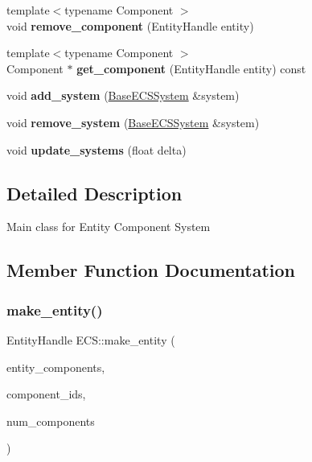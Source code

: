 \begin{DoxyCompactItemize}
{\footnotesize template$<$typename Component $>$ }\\void {\bfseries remove\+\_\+component} (Entity\+Handle entity)
\item 
\mbox{\label{classECS_a05bf55eb5a0a8d49881fac023b50581e}} 
{\footnotesize template$<$typename Component $>$ }\\Component $\ast$ {\bfseries get\+\_\+component} (Entity\+Handle entity) const
\item 
\mbox{\label{classECS_af3e5006e5d71622d79c0add84a103e4e}} 
void {\bfseries add\+\_\+system} (\hyperlink{classBaseECSSystem}{Base\+E\+C\+S\+System} \&system)
\item 
\mbox{\label{classECS_a5ca1fe0202fe1a59f76ac061bb247fe8}} 
void {\bfseries remove\+\_\+system} (\hyperlink{classBaseECSSystem}{Base\+E\+C\+S\+System} \&system)
\item 
\mbox{\label{classECS_ab565442f53e9175caeac308b2947ccc8}} 
void {\bfseries update\+\_\+systems} (float delta)
\end{DoxyCompactItemize}


\subsection{Detailed Description}
Main class for Entity Component System 

\subsection{Member Function Documentation}
\mbox{\label{classECS_aeb3ab746cd0f198cd86631489e438ea6}} 
\subsubsection{\texorpdfstring{make\+\_\+entity()}{make\_entity()}}
{\footnotesize\ttfamily Entity\+Handle E\+C\+S\+::make\+\_\+entity (\begin{DoxyParamCaption}\item[{\hyperlink{classBaseECSComponent}{Base\+E\+C\+S\+Component} $\ast$}]{entity\+\_\+components,  }\item[{const comp\+Id\+\_\+t $\ast$}]{component\+\_\+ids,  }\item[{size\+\_\+t}]{num\+\_\+components }\end{DoxyParamCaption})}

